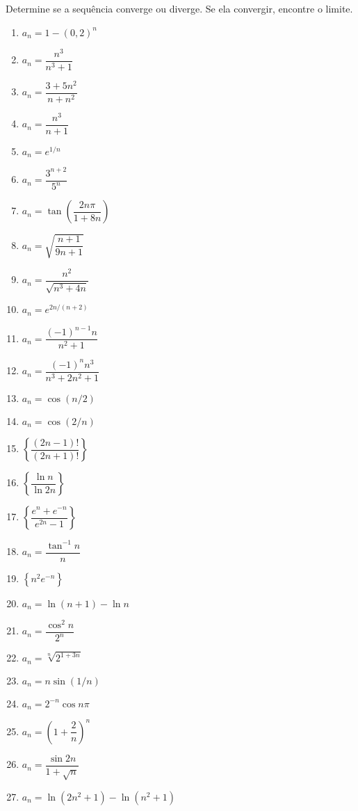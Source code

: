 \item\label{norms}
Determine se a sequência converge ou diverge. Se ela convergir, encontre o limite.

\begin{multicols}{2}
    \begin{enumerate}
        \item $a_n = 1 - (0,2)^n$
        \item $a_n = \dfrac{n^3}{n^3 + 1}$
        \item $a_n = \dfrac{3 + 5n^2}{n + n^2}$
        \item $a_n = \dfrac{n^3}{n + 1}$
        \item $a_n = e^{1/n}$
        \item $a_n = \dfrac{3^{n+2}}{5^n}$
        \item $a_n = \tan{\left( \dfrac{2n\pi}{1 + 8n} \right)}$
        \item $a_n = \sqrt{ \dfrac{n+1}{9n+1} }$
        \item $a_n = \dfrac{n^2}{\sqrt{n^3 + 4n}}$
        \item $a_n = e^{2n/(n+2)}$
        \item $a_n = \dfrac{(-1)^{n-1}n}{n^2 + 1}$
        \item $a_n = \dfrac{(-1)^{n}n^3}{n^3 + 2n^2 + 1}$
        \item $a_n = \cos{\left( n/2 \right)}$
        \item $a_n = \cos{\left( 2/n \right)}$
        \item $\left\{ \dfrac{(2n-1)!}{(2n+1)!} \right\}$
        \item $\left\{ \dfrac{\ln n}{\ln 2n} \right\}$
        \item $\left\{ \dfrac{e^n + e^{-n}}{e^{2n} - 1} \right\}$
        \item $a_n = \dfrac{\tan^{-1} n}{n}$
        \item $\left\{ n^2 e^{-n} \right\}$
        \item $a_n = \ln (n + 1) - \ln n$
        \item $a_n = \dfrac{\cos^2 n}{2^n}$
        \item $a_n = \sqrt[n]{2^{1+3n}}$
        \item $a_n = n \sin (1/n)$
        \item $a_n = 2^{-n} \cos n\pi$
        \item $a_n = \left( 1 + \dfrac{2}{n} \right)^n $
        \item $a_n = \dfrac{\sin 2n}{1 + \sqrt{n}} $
        \item $a_n = \ln (2n^2 + 1) - \ln (n^2 + 1)$

\end{enumerate}
\end{multicols}
